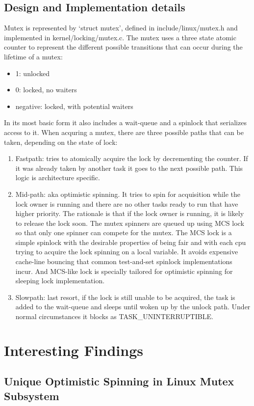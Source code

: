\documentclass[10pt,preprint]{sigplanconf}
\begin{document}
\subsection{Design and Implementation details}
Mutex is represented by ‘struct mutex’, defined in include/linux/mutex.h and implemented in kernel/locking/mutex.c. The mutex uses a three state atomic counter to represent the different possible transitions that can occur during the lifetime of a mutex:
\begin{itemize}
	\item 1: unlocked
	\item 0: locked, no waiters
	\item negative: locked, with potential waiters
\end{itemize}
In its most basic form it also includes a wait-queue and a spinlock that serializes access to it. When acquring a mutex, there are three possible paths that can be taken, depending on the state of lock:
\begin{enumerate}
	\item Fastpath: tries to atomically acquire the lock by decrementing the counter. If it was already taken by another task it goes to the next possible path. This logic is architecture specific.
	\item Mid-path: aka optimistic spinning. It tries to spin for acquisition while the lock owner is running and there are no other tasks ready to run that have higher priority. The rationale is that if the lock owner is running, it is likely to release the lock soon. The mutex spinners are queued up using MCS lock so that only one spinner can compete for the mutex. The MCS lock is a simple spinlock with the desirable properties of being fair and with each cpu trying to acquire the lock spinning on a local variable. It avoids expensive cache-line bouncing that common test-and-set spinlock implementations incur. And MCS-like lock is specially tailored for optimistic spinning for sleeping lock implementation.
	\item Slowpath: last resort, if the lock is still unable to be acquired, the task is added to the wait-queue and sleeps until woken up by the unlock path. Under normal circumstances it blocks as TASK\_UNINTERRUPTIBLE.
\end{enumerate}

\section{Interesting Findings}
\subsection{Unique Optimistic Spinning in Linux Mutex Subsystem}




% 
\end{document}
